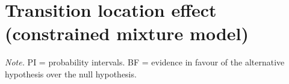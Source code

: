 \documentclass[
  man,floatsintext]{apa7}
\begin{document}
\begin{center}
\begin{ThreePartTable}
{}

\end{ThreePartTable}
\end{center}

\newpage

\hypertarget{transition-location-effect-constrained-mixture-model}{%
\section{Transition location effect (constrained mixture model)}\label{transition-location-effect-constrained-mixture-model}}

\begin{center}
\begin{ThreePartTable}

\begin{TableNotes}[para]
\normalsize{\textit{Note.} PI = probability intervals. BF = evidence in favour of the alternative hypothesis over the null hypothesis.}
\end{TableNotes}

\footnotesize{

}
\end{ThreePartTable}
\end{center}
\end{document}
